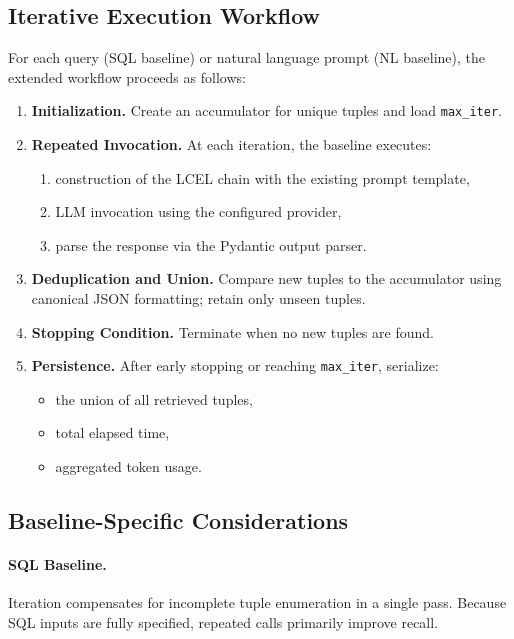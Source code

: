 \subsection{Iterative Execution Workflow}

For each query (SQL baseline) or natural language prompt (NL baseline), the extended
workflow proceeds as follows:

\begin{enumerate}
    \item \textbf{Initialization.}  
    Create an accumulator for unique tuples and load \texttt{max\_iter}.

    \item \textbf{Repeated Invocation.}
    At each iteration, the baseline executes:
    \begin{enumerate}
        \item construction of the LCEL chain with the existing prompt template,
        \item LLM invocation using the configured provider,
        \item parse the response via the Pydantic output parser.
    \end{enumerate}

    \item \textbf{Deduplication and Union.}  
    Compare new tuples to the accumulator using canonical JSON formatting; retain
    only unseen tuples.

    \item \textbf{Stopping Condition.}  
    Terminate when no new tuples are found.

    \item \textbf{Persistence.}  
    After early stopping or reaching \texttt{max\_iter}, serialize:
    \begin{itemize}
        \item the union of all retrieved tuples,
        \item total elapsed time,
        \item aggregated token usage.
    \end{itemize}
\end{enumerate}

\subsection{Baseline-Specific Considerations}

\paragraph{SQL Baseline.}  
Iteration compensates for incomplete tuple enumeration in a single pass. Because SQL
inputs are fully specified, repeated calls primarily improve recall.

